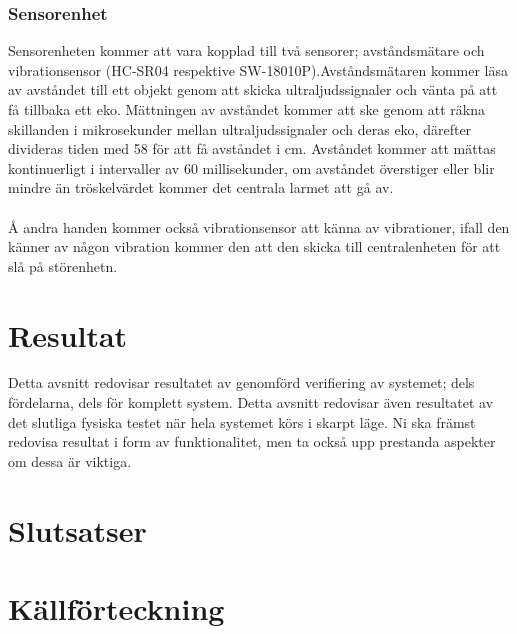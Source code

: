 \documentclass{article}
\begin{document}
\subsubsection{Sensorenhet}

Sensorenheten kommer att vara kopplad till två sensorer; avståndsmätare och vibrationsensor (HC-SR04 respektive SW-18010P).Avståndsmätaren kommer läsa av avståndet till ett objekt genom att skicka ultraljudssignaler och vänta på att få tillbaka ett eko. Mättningen av avståndet kommer att ske genom att räkna skillanden i mikrosekunder mellan ultraljudssignaler och deras eko, därefter divideras tiden med 58 för att få avståndet i cm. Avståndet kommer att mättas kontinuerligt i intervaller av 60 millisekunder, om avståndet överstiger eller blir mindre än tröskelvärdet kommer det centrala larmet att gå av.\\
\\
Å andra handen kommer också vibrationsensor att känna av vibrationer, ifall den känner av någon vibration kommer den att den skicka till centralenheten för att slå på störenhetn.



\section{Resultat}
Detta avsnitt redovisar resultatet av genomförd verifiering av systemet; dels fördelarna, dels för 
komplett system. Detta avsnitt redovisar även resultatet av det slutliga fysiska testet när hela systemet 
körs i skarpt läge. Ni ska främst redovisa resultat i form av funktionalitet, men ta också upp prestanda 
aspekter om dessa är viktiga.  
\section{Slutsatser}
\newpage
\section{Källförteckning}
\printbibliography[title=\n]
\end{document}
